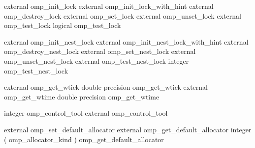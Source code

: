 {\begin{ompfSyntax}
     external omp_init_lock
     external omp_init_lock_with_hint
     external omp_destroy_lock
     external omp_set_lock
     external omp_unset_lock
     external omp_test_lock
     logical omp_test_lock

     external omp_init_nest_lock
     external omp_init_nest_lock_with_hint
     external omp_destroy_nest_lock
     external omp_set_nest_lock
     external omp_unset_nest_lock
     external omp_test_nest_lock
     integer omp_test_nest_lock

     external omp_get_wtick
     double precision omp_get_wtick
     external omp_get_wtime
     double precision omp_get_wtime

     integer  omp_control_tool
     external omp_control_tool

     external omp_set_default_allocator
     external omp_get_default_allocator
     integer ( omp_allocator_kind ) omp_get_default_allocator

\end{ompfSyntax}}





